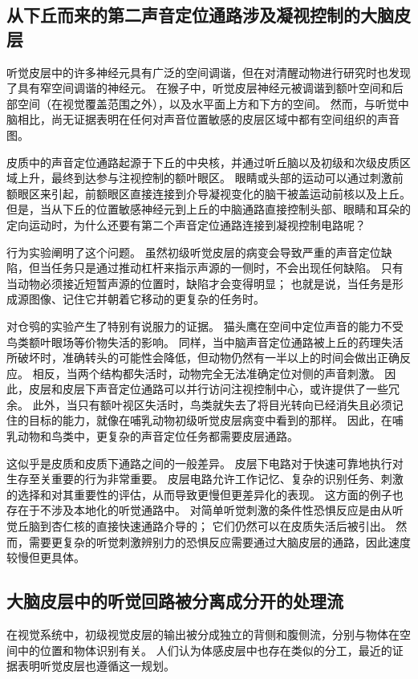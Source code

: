 \subsection{从下丘而来的第二声音定位通路涉及凝视控制的大脑皮层}
听觉皮层中的许多神经元具有广泛的空间调谐，但在对清醒动物进行研究时也发现了具有窄空间调谐的神经元。 
在猴子中，听觉皮层神经元被调谐到额叶空间和后部空间（在视觉覆盖范围之外），以及水平面上方和下方的空间。 
然而，与听觉中脑相比，尚无证据表明在任何对声音位置敏感的皮层区域中都有空间组织的声音图。


皮质中的声音定位通路起源于下丘的中央核，并通过听丘脑以及初级和次级皮质区域上升，最终到达参与注视控制的额叶眼区。 
眼睛或头部的运动可以通过刺激前额眼区来引起，前额眼区直接连接到介导凝视变化的脑干被盖运动前核以及上丘。 
但是，当从下丘的位置敏感神经元到上丘的中脑通路直接控制头部、眼睛和耳朵的定向运动时，为什么还要有第二个声音定位通路连接到凝视控制电路呢？


行为实验阐明了这个问题。 
虽然初级听觉皮层的病变会导致严重的声音定位缺陷，但当任务只是通过推动杠杆来指示声源的一侧时，不会出现任何缺陷。 
只有当动物必须接近短暂声源的位置时，缺陷才会变得明显； 
也就是说，当任务是形成源图像、记住它并朝着它移动的更复杂的任务时。


对仓鸮的实验产生了特别有说服力的证据。 
猫头鹰在空间中定位声音的能力不受鸟类额叶眼场等价物失活的影响。 
同样，当中脑声音定位通路被上丘的药理失活所破坏时，准确转头的可能性会降低，但动物仍然有一半以上的时间会做出正确反应。 
相反，当两个结构都失活时，动物完全无法准确定位对侧的声音刺激。 
因此，皮层和皮层下声音定位通路可以并行访问注视控制中心，或许提供了一些冗余。 
此外，当只有额叶视区失活时，鸟类就失去了将目光转向已经消失且必须记住的目标的能力，就像在哺乳动物初级听觉皮层病变中看到的那样。 
因此，在哺乳动物和鸟类中，更复杂的声音定位任务都需要皮层通路。


这似乎是皮质和皮质下通路之间的一般差异。 
皮层下电路对于快速可靠地执行对生存至关重要的行为非常重要。 
皮层电路允许工作记忆、复杂的识别任务、刺激的选择和对其重要性的评估，从而导致更慢但更差异化的表现。 
这方面的例子也存在于不涉及本地化的听觉通路中。 
对简单听觉刺激的条件性恐惧反应是由从听觉丘脑到杏仁核的直接快速通路介导的； 它们仍然可以在皮质失活后被引出。 
然而，需要更复杂的听觉刺激辨别力的恐惧反应需要通过大脑皮层的通路，因此速度较慢但更具体。


\subsection{大脑皮层中的听觉回路被分离成分开的处理流}
在视觉系统中，初级视觉皮层的输出被分成独立的背侧和腹侧流，分别与物体在空间中的位置和物体识别有关。 
人们认为体感皮层中也存在类似的分工，最近的证据表明听觉皮层也遵循这一规划。


